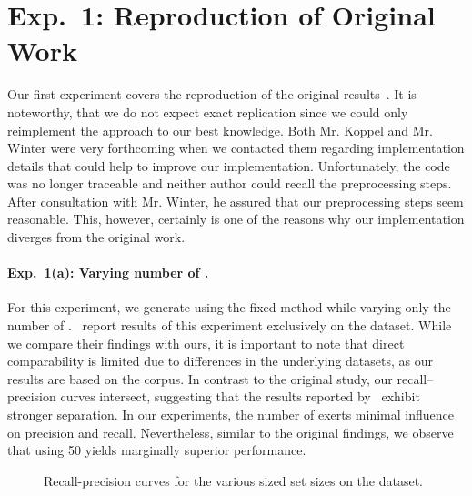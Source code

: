 
\section{Exp.\ 1: Reproduction of Original Work}

Our first experiment covers the reproduction of the original results~\citep{koppel_determining_2014}.
It is noteworthy, that we do not expect exact replication since we could only reimplement the approach to our best knowledge.
Both Mr. Koppel and Mr. Winter were very forthcoming when we contacted them regarding implementation details that could help to improve our implementation.
Unfortunately, the code was no longer traceable and neither author could recall the preprocessing steps.
After consultation with Mr. Winter, he assured that our preprocessing steps seem reasonable.
This, however, certainly is one of the reasons why our implementation diverges from the original work.

\paragraph{Exp.\ 1(a): Varying number of \imps{}.}

For this experiment, we generate \imps{} using the fixed method while varying only the number of \imps{}.
\citet{koppel_determining_2014}\ report results of this experiment exclusively on the \dataBlog{} dataset.
While we compare their findings with ours, it is important to note that direct comparability is limited due to differences in the underlying datasets, as our results are based on the \dataStudent{} corpus.
In contrast to the original study, our \impAppr{} recall–precision curves intersect, suggesting that the results reported by \citet{koppel_determining_2014}\ exhibit stronger separation.
In our experiments, the number of \imps{} exerts minimal influence on precision and recall.
Nevertheless, similar to the original findings, we observe that using 50 \imps{} yields marginally superior performance.


\begin{figure}[htbp]
    \centering
    
    \caption[Recall-precision curves for the various sized \imp{} set sizes.]{Recall-precision curves for the various sized \imp{} set sizes on the \dataStudent{} dataset.}
    \label{fig:student_essays_dif_n}
\end{figure}

